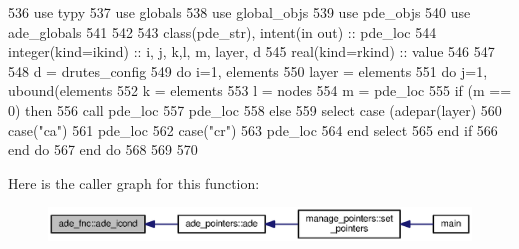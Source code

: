 \begin{DoxyCode}
536       \textcolor{keywordtype}{use }typy
537       \textcolor{keywordtype}{use }globals
538       \textcolor{keywordtype}{use }global_objs
539       \textcolor{keywordtype}{use }pde_objs
540       \textcolor{keywordtype}{use }ade_globals
541 
542       
543       \textcolor{keywordtype}{class}(pde_str), \textcolor{keywordtype}{intent(in out)} :: pde\_loc
544       \textcolor{keywordtype}{integer(kind=ikind)} :: i, j, k,l, m, layer, d
545       \textcolor{keywordtype}{real(kind=rkind)} :: value
546       
547    
548       d = drutes_config%
549       \textcolor{keywordflow}{do} i=1, elements%
550         layer = elements%
551         \textcolor{keywordflow}{do} j=1, ubound(elements%
552           k = elements%
553           l = nodes%
554           m = pde\_loc%
555           \textcolor{keywordflow}{if} (m == 0) \textcolor{keywordflow}{then}
556             \textcolor{keyword}{call }pde\_loc%
557             pde\_loc%
558           \textcolor{keywordflow}{else}
559             \textcolor{keywordflow}{select case} (adepar(layer)%
560               \textcolor{keywordflow}{case}(\textcolor{stringliteral}{"ca"})
561                 pde\_loc%
562               \textcolor{keywordflow}{case}(\textcolor{stringliteral}{"cr"})
563                 pde\_loc%
564 \textcolor{keywordflow}{            end select}
565 \textcolor{keywordflow}{          end if}
566 \textcolor{keywordflow}{        end do}   
567 \textcolor{keywordflow}{      end do}
568 
569     
570     
\end{DoxyCode}


Here is the caller graph for this function\+:\nopagebreak
\begin{figure}[H]
\begin{center}
\leavevmode
\includegraphics[width=350pt]{namespaceade__fnc_a114f89bc8bfdca6b691d3e4afd2a7da7_icgraph}
\end{center}
\end{figure}


